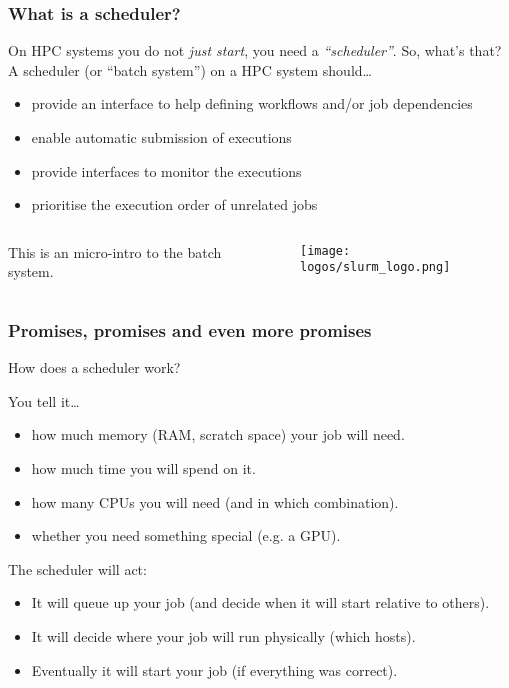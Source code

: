 \begin{frame}
  \frametitle{What is a scheduler?}
  On HPC systems you do not \emph{just start}, you need a \emph{``scheduler''}.
  So, what's that?\newline
  A scheduler (or ``batch system'') on a HPC system should\ldots
  \begin{itemize}
  \item provide an interface to help defining workflows and/or job dependencies
  \item enable automatic submission of executions
  \item provide interfaces to monitor the executions
  \item prioritise the execution order of unrelated jobs
  \end{itemize}
  \begin{columns}
    \begin{column}{0.8\linewidth}
      This is an micro-intro to the \slurm batch system.
    \end{column}
    \begin{column}{0.2\linewidth}
      \begin{figure}
        \centering
        \texttt{[image: logos/slurm\_logo.png]}
      \end{figure}
    \end{column}
  \end{columns}
  \vfill
\end{frame}

\begin{frame}
  \frametitle{Promises, promises and even more promises}
  How does a scheduler work?
  \pause
  \begin{block}{You tell it\ldots}
    \begin{itemize}
    \item how much memory (RAM, scratch space) your job will need.\pause
    \item how much time you will spend on it.\pause
    \item how many CPUs you will need (and in which combination).\pause
    \item whether you need something special (e.g. a GPU).
    \end{itemize}
  \end{block}
  \pause \vspace{-0.2cm}
  \begin{exampleblock}{The scheduler will act:}
    \begin{itemize}
    \item It will queue up your job (and decide when it will start relative to others).\pause
    \item It will decide where your job will run physically (which hosts).\pause
    \item Eventually it will start your job (if everything was correct).
    \end{itemize}
  \end{exampleblock}
  \vfill
\end{frame}

